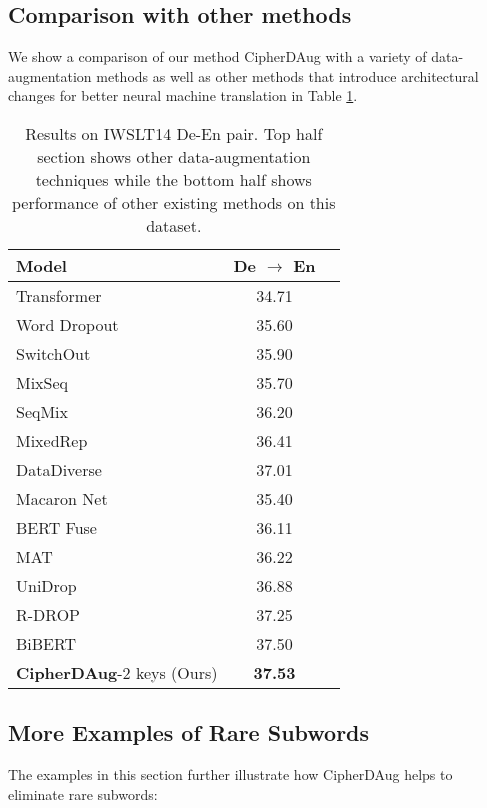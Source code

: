 \documentclass[11pt]{article}
\begin{document}
\subsection{Comparison with other methods}




We show a comparison of our method CipherDAug with a variety of data-augmentation  methods as well as other methods that introduce architectural changes for better neural machine translation in Table \ref{tab:othermethods}.

\begin{table}[ht]

\footnotesize
\centering
\begin{tabular}{lcl}
\toprule
 \textbf{Model} & \textbf{De $\rightarrow$ En} \\ \midrule
 Transformer & 34.71 \\
 \hline
 Word Dropout & 35.60 \\
 SwitchOut & 35.90 \\
 MixSeq \cite{wu-etal-2021-mixseq} & 35.70 \\
 SeqMix \cite{guo2020sequence} & 36.20 \\
 MixedRep \cite{pmlr-v119-wu20e} & 36.41 \\
 DataDiverse \cite{nguyen2020data} & 37.01 \\
 \midrule
 Macaron Net \cite{lu*2020understanding} & 35.40 \\
 BERT Fuse \cite{Zhu2020Incorporating} & 36.11 \\
 MAT \cite{fan2020multibranch} & 36.22 \\ 
 UniDrop \cite{wu-etal-2021-unidrop} & 36.88 \\
 R-DROP \cite{liang2021rdrop} & 37.25 \\
 BiBERT \cite{xu2021bert} & 37.50 \\
 \midrule
 \textbf{CipherDAug}-2 keys (Ours) & \textbf{37.53} \\ 
\bottomrule
\end{tabular}
\caption{Results on IWSLT14 De-En pair. Top half section shows other data-augmentation techniques while the bottom half shows performance of other existing methods on this dataset.}
\label{tab:othermethods}
\end{table}

\subsection{More Examples of Rare Subwords}
The examples in this section further illustrate how CipherDAug helps to eliminate rare subwords:
\end{document}
